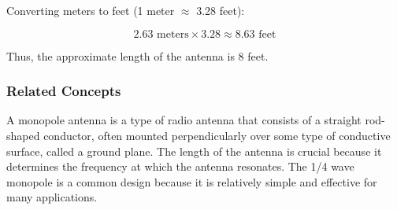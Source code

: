 Converting meters to feet (1 meter $\approx$ 3.28 feet):

\[
2.63 \text{ meters} \times 3.28 \approx 8.63 \text{ feet}
\]

Thus, the approximate length of the antenna is 8 feet.

\subsubsection{Related Concepts}
A monopole antenna is a type of radio antenna that consists of a straight rod-shaped conductor, often mounted perpendicularly over some type of conductive surface, called a ground plane. The length of the antenna is crucial because it determines the frequency at which the antenna resonates. The 1/4 wave monopole is a common design because it is relatively simple and effective for many applications.

